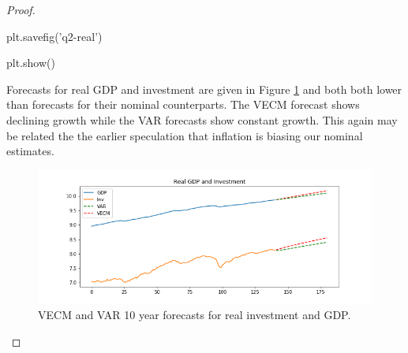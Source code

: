 \documentclass[oneside,reqno]{amsart}
\theoremstyle{definition}
\begin{document}
\begin{enumerate}[label=(\roman*)]
\begin{proof}
\begin{python3code}
plt.savefig('q2-real')

plt.show()
\end{python3code}

Forecasts for real GDP and investment are given in Figure \ref{q2-real} and both both lower than forecasts for their nominal counterparts. The VECM forecast shows declining growth while the VAR forecasts show constant growth. This again may be related the the earlier speculation that inflation is biasing our nominal estimates.

\begin{figure}
\includegraphics[width=\textwidth]{q2-real}
\caption{VECM and VAR 10 year forecasts for real investment and GDP.}
\label{q2-real}
\end{figure}

\end{proof}
\end{enumerate}
\end{document}
